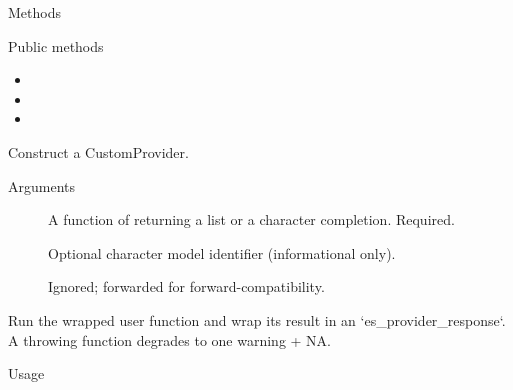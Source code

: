 \documentclass[a4paper]{book}
\begin{document}
\begin{Section}{Methods}
%
\begin{SubSection}{Public methods}
\begin{itemize}

\item{} 
\item{} 
\item{} 

\end{itemize}

\end{SubSection}



\hypertarget{method-CustomProvider-initialize}{}
%
\begin{SubSection}{}
Construct a CustomProvider.
%

%
\begin{SubSubSection}{Arguments}

\begin{description}

\item[] A function of  returning a list or a
character completion. Required.
\item[] Optional character model identifier (informational only).
\item[] Ignored; forwarded for forward-compatibility.

\end{description}



\end{SubSubSection}

\end{SubSection}




\hypertarget{method-CustomProvider-complete}{}
%
\begin{SubSection}{}
Run the wrapped user function and wrap its result in an
`es\_provider\_response`. A throwing function degrades to one warning + NA.
%
\begin{SubSubSection}{Usage}


\end{SubSubSection}
\end{SubSection}
\end{Section}
\end{document}
